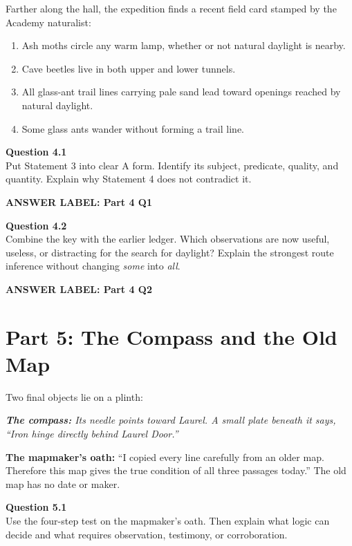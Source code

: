 \documentclass[12pt]{article}
\newcommand{\answerbox}[2]{%
\vspace{0.12em}\noindent\textbf{#1}\par\vspace{0.04em}
\noindent\fbox{\begin{minipage}[t][#2]{\dimexpr\textwidth-2\fboxsep-2\fboxrule}\rule{\textwidth}{0pt}\vspace{#2}\end{minipage}}\par\vspace{0.22em}}
\newcommand{\cluebox}[1]{%
\par\vspace{0.12em}\noindent\begin{minipage}{\textwidth}\itshape #1\end{minipage}\par\vspace{0.12em}}
\begin{document}
Farther along the hall, the expedition finds a recent field card stamped by the Academy naturalist:

\cluebox{
\begin{enumerate}[label=\arabic*.,leftmargin=1.7em,itemsep=0.12em]
\item Ash moths circle any warm lamp, whether or not natural daylight is nearby.
\item Cave beetles live in both upper and lower tunnels.
\item All glass-ant trail lines carrying pale sand lead toward openings reached by natural daylight.
\item Some glass ants wander without forming a trail line.
\end{enumerate}}

\textbf{Question 4.1}\\[-0.15em]
Put Statement 3 into clear A form. Identify its subject, predicate, quality, and quantity. Explain why Statement 4 does not contradict it.

\answerbox{ANSWER LABEL: Part 4 Q1}{2.15in}

\textbf{Question 4.2}\\[-0.15em]
Combine the key with the earlier ledger. Which observations are now useful, useless, or distracting for the search for daylight? Explain the strongest route inference without changing \emph{some} into \emph{all}.

\answerbox{ANSWER LABEL: Part 4 Q2}{2.15in}

\newpage

\section*{Part 5: The Compass and the Old Map}

Two final objects lie on a plinth:

\cluebox{\textbf{The compass:} Its needle points toward Laurel. A small plate beneath it says, ``Iron hinge directly behind Laurel Door.''

\textbf{The mapmaker's oath:} ``I copied every line carefully from an older map. Therefore this map gives the true condition of all three passages today.'' The old map has no date or maker.}

\textbf{Question 5.1}\\[-0.15em]
Use the four-step test on the mapmaker's oath. Then explain what logic can decide and what requires observation, testimony, or corroboration.
\end{document}
